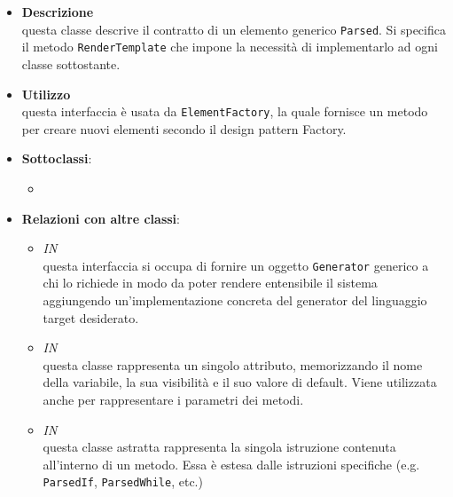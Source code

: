 \label{\nogloxy{swedesigner::server::project::ParsedElement}}
\begin{itemize}
\item \textbf{Descrizione}\\
questa classe descrive il contratto di un elemento generico \texttt{Parsed}. Si specifica il metodo \texttt{RenderTemplate} che impone la necessità di implementarlo ad ogni classe sottostante.
\item \textbf{Utilizzo}\\
questa interfaccia è usata da \texttt{ElementFactory}, la quale fornisce un metodo per creare nuovi elementi secondo il design pattern Factory. %
\item \textbf{Sottoclassi}:
\begin{itemize}
\item \hyperref[\nogloxy{swedesigner::server::project::ParsedMethod}]{}
\end{itemize}
\item \textbf{Relazioni con altre classi}:
\begin{itemize}
\item \textit{IN} \hyperref[\nogloxy{swedesigner::server::generator::Generator}]{}\\
questa interfaccia si occupa di fornire un oggetto \texttt{Generator} generico a chi lo richiede in modo da poter rendere entensibile il sistema aggiungendo un'implementazione concreta del generator del linguaggio target desiderato.
\item \textit{IN} \hyperref[\nogloxy{swedesigner::server::project::ParsedAttribute}]{}\\
questa classe rappresenta un singolo attributo, memorizzando il nome della variabile, la sua visibilità e il suo valore di default. Viene utilizzata anche per rappresentare i parametri dei metodi.
\item \textit{IN} \hyperref[\nogloxy{swedesigner::server::project::ParsedInstruction}]{}\\
questa classe astratta rappresenta la singola istruzione contenuta all'interno di un metodo. Essa è estesa dalle istruzioni specifiche (e.g. \texttt{ParsedIf}, \texttt{ParsedWhile}, etc.)

\end{itemize}
\end{itemize}
